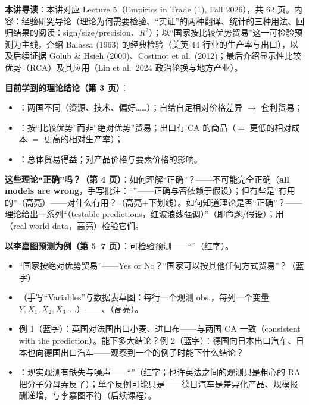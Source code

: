 
\textbf{本讲导读}：本讲对应 Lecture 5（Empirics in Trade (1), Fall 2026），共 62 页。内容：经验研究导论（理论为何需要检验、``实证''的两种翻译、统计的三种用法、回归结果的阅读：sign/size/precision、$R^2$）；以``国家按比较优势贸易''这一可检验预测为主线，介绍 Balassa (1963) 的经典检验（美英 44 行业的生产率与出口），以及后续证据 Golub \& Hsieh (2000)、Costinot et al.\ (2012)；最后介绍显示性比较优势（RCA）及其应用（Lin et al.\ 2024 政治轮换与地方产业）。


\textbf{目前学到的理论结论（第 3 页）}：
\begin{itemize}
  \item {}：两国不同（资源、技术、偏好……）；自给自足相对价格差异 $\to$ 套利贸易；
  \item {}：按``比较优势''而非``绝对优势''贸易；出口有 CA 的商品（$=$ 更低的相对成本 $=$ 更高的相对生产率）；
  \item {}：总体贸易得益；对产品价格与要素价格的影响。
\end{itemize}

\textbf{这些理论``正确''吗？（第 4 页）}：如何理解``正确''？——不可能完全正确（\textbf{all models are wrong}，手写批注：``''——正确与否依赖于假设）；但有些是``有用的''（高亮）——对什么有用？（高亮+下划线）。如何知道理论是否``正确''？——理论给出一系列``（testable predictions，红波浪线强调）''（即命题/假设）；用（real world data，高亮）检验它们。

\textbf{以李嘉图预测为例（第 5--7 页）}：可检验预测——``''（红字）。
\begin{itemize}
  \item {}``国家按绝对优势贸易''——Yes or No？``国家可以按其他任何方式贸易''？（蓝字）
  \item {}（手写``Variables''与数据表草图：每行一个观测 obs.，每列一个变量 $Y, X_1, X_2, X_3, \dots$）——、（高亮）。
  \item {}例 1（蓝字）：英国对法国出口小麦、进口布——与两国 CA 一致（consistent with the prediction）。能下多大结论？例 2（蓝字）：德国向日本出口汽车、日本也向德国出口汽车——观察到一个的例子时能下什么结论？
  \item {}：现实观测有缺失与噪声——``''（红字；也许英法之间的观测只是粗心的 RA 把分子分母弄反了）；单个反例可能只是——德日汽车是差异化产品、规模报酬递增，与李嘉图不符（后续课程）。
\end{itemize}

